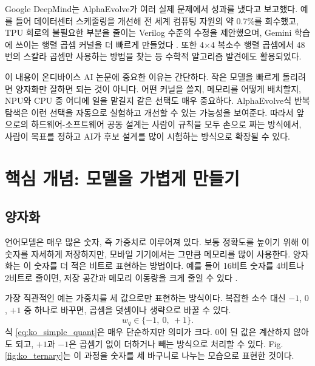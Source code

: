 \documentclass[twocolumn,10pt]{article}
\begin{document}
Google DeepMind는 AlphaEvolve가 여러 실제 문제에서 성과를 냈다고 보고했다. 예를 들어 데이터센터 스케줄링을 개선해 전 세계 컴퓨팅 자원의 약 0.7\%를 회수했고, TPU 회로의 불필요한 부분을 줄이는 Verilog 수준의 수정을 제안했으며, Gemini 학습에 쓰이는 행렬 곱셈 커널을 더 빠르게 만들었다 \cite{deepmind_alphaevolve_2025}. 또한 4$\times$4 복소수 행렬 곱셈에서 48번의 스칼라 곱셈만 사용하는 방법을 찾는 등 수학적 알고리즘 발견에도 활용되었다.

이 내용이 온디바이스 AI 논문에 중요한 이유는 간단하다. 작은 모델을 빠르게 돌리려면 양자화만 잘하면 되는 것이 아니다. 어떤 커널을 쓸지, 메모리를 어떻게 배치할지, NPU와 CPU 중 어디에 일을 맡길지 같은 선택도 매우 중요하다. AlphaEvolve식 반복 탐색은 이런 선택을 자동으로 실험하고 개선할 수 있는 가능성을 보여준다. 따라서 앞으로의 하드웨어-소프트웨어 공동 설계는 사람이 규칙을 모두 손으로 짜는 방식에서, 사람이 목표를 정하고 AI가 후보 설계를 많이 시험하는 방식으로 확장될 수 있다.

\section{핵심 개념: 모델을 가볍게 만들기}
\subsection{양자화}
언어모델은 매우 많은 숫자, 즉 가중치로 이루어져 있다. 보통 정확도를 높이기 위해 이 숫자를 자세하게 저장하지만, 모바일 기기에서는 그만큼 메모리를 많이 사용한다. 양자화는 이 숫자를 더 적은 비트로 표현하는 방법이다. 예를 들어 16비트 숫자를 4비트나 2비트로 줄이면, 저장 공간과 메모리 이동량을 크게 줄일 수 있다 \cite{frantar2022gptq,lin2023awq}.

가장 직관적인 예는 가중치를 세 값으로만 표현하는 방식이다. 복잡한 소수 대신 $-1$, $0$, $+1$ 중 하나로 바꾸면, 곱셈을 덧셈이나 생략으로 바꿀 수 있다.
\begin{equation}
w_q \in \{-1,\ 0,\ +1\}.
\label{eq:ko_simple_quant}
\end{equation}
식 \ref{eq:ko_simple_quant}은 매우 단순하지만 의미가 크다. $0$이 된 값은 계산하지 않아도 되고, $+1$과 $-1$은 곱셈기 없이 더하거나 빼는 방식으로 처리할 수 있다. Fig. \ref{fig:ko_ternary}는 이 과정을 숫자를 세 바구니로 나누는 모습으로 표현한 것이다.
\end{document}

